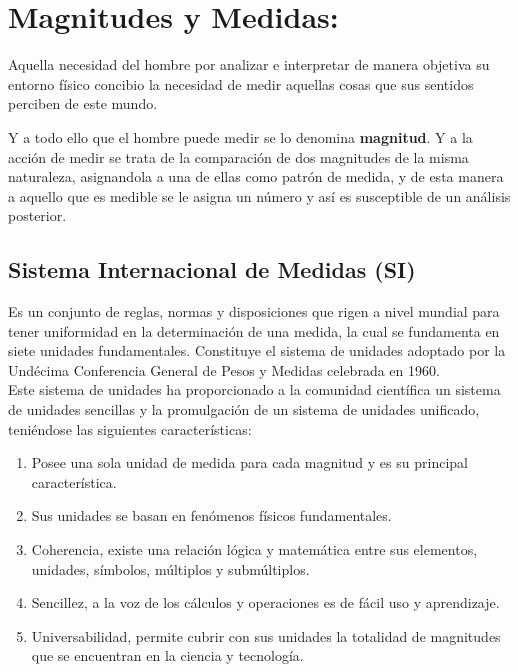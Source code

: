 \section{Magnitudes y Medidas:}

Aquella necesidad del hombre por analizar e interpretar de manera objetiva su entorno físico concibio la necesidad de medir 
aquellas cosas que sus sentidos perciben de este mundo.

Y a todo ello que el hombre puede medir se lo denomina \textbf{magnitud}. Y a la acción de medir se trata de la comparación de 
dos 
magnitudes de la misma naturaleza, asignandola a una de ellas como patrón de medida, y de esta manera a aquello que es medible se 
le asigna un número y así es susceptible de un análisis posterior.

\subsection{Sistema Internacional de Medidas (SI)}

Es un conjunto de reglas, normas y disposiciones que rigen a nivel mundial para tener uniformidad en la determinación de una 
medida, la cual se fundamenta en siete unidades fundamentales. Constituye el sistema de unidades adoptado por la Undécima 
Conferencia General de Pesos y Medidas celebrada en 1960.\\ 

Este sistema de unidades ha proporcionado a la comunidad científica un sistema de unidades sencillas y la promulgación de un 
sistema de unidades unificado, teniéndose las siguientes características:

\begin{enumerate}

 \item Posee una sola unidad de medida para cada magnitud y es su principal característica.
 
 \item  Sus unidades se basan en fenómenos físicos fundamentales.

 \item Coherencia, existe una relación lógica y matemática entre sus elementos, unidades, símbolos, múltiplos y submúltiplos.
 
 \item Sencillez, a la voz de los cálculos y operaciones es de fácil uso y aprendizaje.
 
 \item Universabilidad, permite cubrir con sus unidades la totalidad de magnitudes que se encuentran en la ciencia y tecnología.
 
\end{enumerate}



